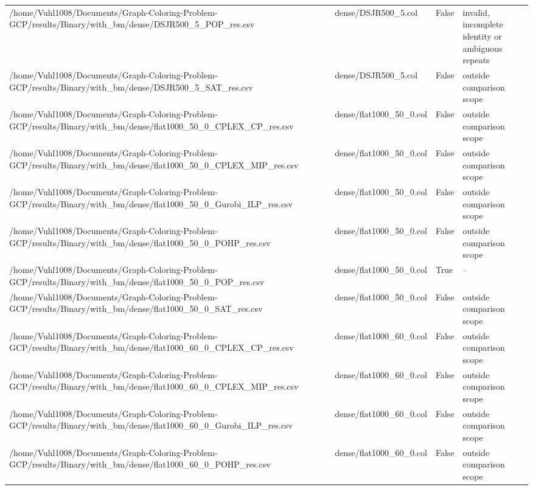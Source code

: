 \begin{table}[htbp]
\begin{tabular}{llll}
/home/Vuhl1008/Documents/Graph-Coloring-Problem-GCP/results/Binary/with\_bm/dense/DSJR500\_5\_POP\_res.csv & dense/DSJR500\_5.col & False & invalid, incomplete identity or ambiguous repeats \\
/home/Vuhl1008/Documents/Graph-Coloring-Problem-GCP/results/Binary/with\_bm/dense/DSJR500\_5\_SAT\_res.csv & dense/DSJR500\_5.col & False & outside comparison scope \\
/home/Vuhl1008/Documents/Graph-Coloring-Problem-GCP/results/Binary/with\_bm/dense/flat1000\_50\_0\_CPLEX\_CP\_res.csv & dense/flat1000\_50\_0.col & False & outside comparison scope \\
/home/Vuhl1008/Documents/Graph-Coloring-Problem-GCP/results/Binary/with\_bm/dense/flat1000\_50\_0\_CPLEX\_MIP\_res.csv & dense/flat1000\_50\_0.col & False & outside comparison scope \\
/home/Vuhl1008/Documents/Graph-Coloring-Problem-GCP/results/Binary/with\_bm/dense/flat1000\_50\_0\_Gurobi\_ILP\_res.csv & dense/flat1000\_50\_0.col & False & outside comparison scope \\
/home/Vuhl1008/Documents/Graph-Coloring-Problem-GCP/results/Binary/with\_bm/dense/flat1000\_50\_0\_POHP\_res.csv & dense/flat1000\_50\_0.col & False & outside comparison scope \\
/home/Vuhl1008/Documents/Graph-Coloring-Problem-GCP/results/Binary/with\_bm/dense/flat1000\_50\_0\_POP\_res.csv & dense/flat1000\_50\_0.col & True & -- \\
/home/Vuhl1008/Documents/Graph-Coloring-Problem-GCP/results/Binary/with\_bm/dense/flat1000\_50\_0\_SAT\_res.csv & dense/flat1000\_50\_0.col & False & outside comparison scope \\
/home/Vuhl1008/Documents/Graph-Coloring-Problem-GCP/results/Binary/with\_bm/dense/flat1000\_60\_0\_CPLEX\_CP\_res.csv & dense/flat1000\_60\_0.col & False & outside comparison scope \\
/home/Vuhl1008/Documents/Graph-Coloring-Problem-GCP/results/Binary/with\_bm/dense/flat1000\_60\_0\_CPLEX\_MIP\_res.csv & dense/flat1000\_60\_0.col & False & outside comparison scope \\
/home/Vuhl1008/Documents/Graph-Coloring-Problem-GCP/results/Binary/with\_bm/dense/flat1000\_60\_0\_Gurobi\_ILP\_res.csv & dense/flat1000\_60\_0.col & False & outside comparison scope \\
/home/Vuhl1008/Documents/Graph-Coloring-Problem-GCP/results/Binary/with\_bm/dense/flat1000\_60\_0\_POHP\_res.csv & dense/flat1000\_60\_0.col & False & outside comparison scope \\

\end{tabular}
\end{table}
